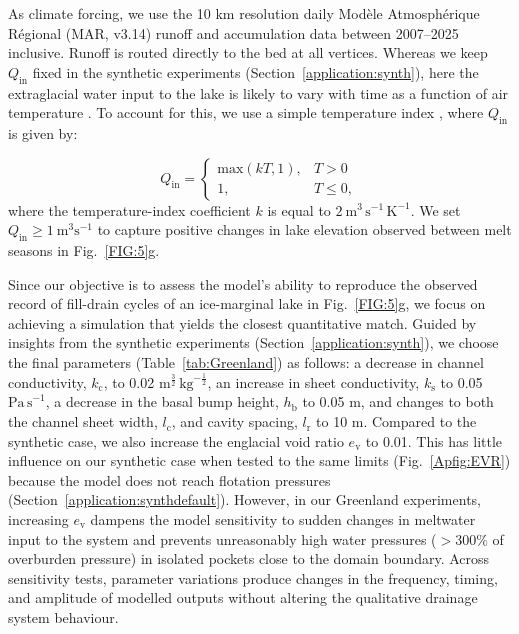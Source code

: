 \documentclass[tc, manuscript]{copernicus}
\begin{document}
As climate forcing, we use the 10 km resolution daily Modèle Atmosphérique Régional (MAR, v3.14) runoff and accumulation data \citep{fettweis2017reconstructions} between 2007--2025 inclusive. Runoff is routed directly to the bed at all vertices. Whereas we keep $Q_{\mathrm{in}}$ fixed in the synthetic experiments (Section~\ref{application:synth}), here the extraglacial water input to the lake is likely to vary with time as a function of air temperature \citep{ng2007climatic,ng2009temporal}. To account for this, we use a simple temperature index \citep[as in][]{kingslake2015chaotic}, where $Q_{\mathrm{in}}$ is given by: 


\begin{equation}
\label{eq:Tempindex}
Q_{\mathrm{in}} =
\begin{cases}
\mathrm{max}(kT,1), & T > 0 \\
1, & T \le 0,
\end{cases}
\end{equation}
\noindent
where the temperature-index coefficient $ k $ is equal to $2\ \mathrm{m}^{3}\, \mathrm{s}^{-1}\, \mathrm{K}^{-1}$. We set $Q_{\mathrm{in}} \geq 1 \ \mathrm{m}^{3}\mathrm{s}^{-1}$ to capture positive changes in lake elevation observed between melt seasons in Fig.~\ref{FIG:5}g. 

Since our objective is to assess the model's ability to reproduce the observed record of fill-drain cycles of an ice-marginal lake in Fig.~\ref{FIG:5}g, we focus on achieving a simulation that yields the closest quantitative match. Guided by insights from the synthetic experiments (Section~\ref{application:synth}), we choose the final parameters (Table~\ref{tab:Greenland}) as follows: a decrease in channel conductivity, $k_{\mathrm{c}}$, to 0.02 $\mathrm{m}^{\frac{3}{2}}\, \mathrm{kg}^{-\frac{1}{2}}$, an increase in sheet conductivity, $k_{\mathrm{s}}$ to 0.05 $\mathrm{Pa\, s}^{-1}$, a decrease in the basal bump height, $h_{\mathrm{b}}$ to 0.05 m, and changes to both the channel sheet width, $l_{\mathrm{c}}$, and cavity spacing, $l_{\mathrm{r}}$ to 10 m. Compared to the synthetic case, we also increase the englacial void ratio $e_{\mathrm{v}}$ to 0.01. This has little influence on our synthetic case when tested to the same limits (Fig.~\ref{Apfig:EVR}) because the model does not reach flotation pressures (Section~\ref{application:synthdefault}). However, in our Greenland experiments, increasing $e_{\mathrm{v}}$ dampens the model sensitivity to sudden changes in meltwater input to the system and prevents unreasonably high water pressures ($>300\%$ of overburden pressure) in isolated pockets close to the domain boundary. Across sensitivity tests, parameter variations produce changes in the frequency, timing, and amplitude of modelled outputs without altering the qualitative drainage system behaviour. 
\end{document}
